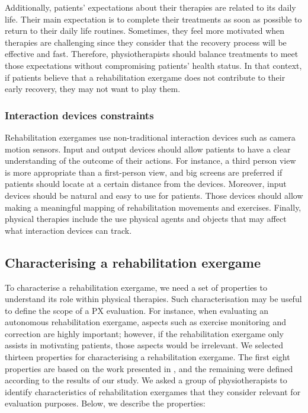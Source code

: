 Additionally, patients' expectations about their therapies are related to its daily life. Their main expectation is to complete their treatments as soon as possible to return to their daily life routines.  Sometimes, they feel more motivated when therapies are challenging since they consider that the recovery process will be effective and fast. Therefore, physiotherapists should balance treatments to meet those expectations without compromising patients' health status. In that context, if patients believe that a rehabilitation exergame does not contribute to their early recovery, they may not want to play them.

\subsubsection{Interaction devices constraints}
\label{sec:interation_dev_constraints}
Rehabilitation exergames use non-traditional interaction devices such as camera motion sensors. Input and output devices should allow patients to have a clear understanding of the outcome of their actions. For instance, a third person view is more appropriate than a first-person view, and big screens are preferred if patients should locate at a certain distance from the devices. Moreover, input devices should be natural and easy to use for patients. Those devices should allow making a meaningful mapping of rehabilitation movements and exercises. Finally, physical therapies include the use physical agents and objects that may affect what interaction devices can track.

\subsection{Characterising a rehabilitation exergame} %
\label{sec:characterising}

To characterise a rehabilitation exergame, we need a set of properties to understand its role within physical therapies. Such characterisation may be useful to define the scope of a PX evaluation. For instance, when evaluating an autonomous rehabilitation exergame, aspects such as exercise monitoring and correction are highly important; however, if the rehabilitation exergame only assists in motivating patients, those aspects would be irrelevant. We selected thirteen properties for characterising a rehabilitation exergame. The first eight properties are based on the work presented in \autocite{PirovanoAdvisor2012}, and the remaining were defined according to the results of our study. We asked a group of physiotherapists to identify characteristics of rehabilitation exergames that they consider relevant for evaluation purposes. Below, we describe the properties:


